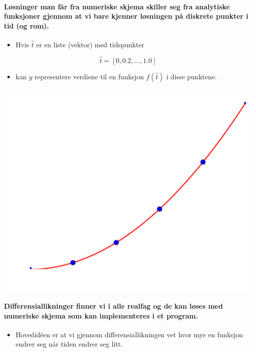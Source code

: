 \documentclass[%
oneside,                 %
final,                   %
10pt,norsk]{article}
\begin{document}
\noindent


\paragraph{Løsninger man får fra numeriske skjema skiller seg fra analytiske funksjoner gjennom at vi bare kjenner løsningen på diskrete punkter i tid (og rom).}
\begin{itemize}
\item Hvis $\hat{t}$ er en liste (vektor) med tidspunkter
\end{itemize}

\noindent
\[\hat{t}=[0, 0.2, \ldots, 1.0]\]
\begin{itemize}
\item kan $y$ representere verdiene til en funksjon $f(\hat{t})$ i disse punktene.
\end{itemize}

\noindent



\centerline{\includegraphics[width=0.6\linewidth]{fig/diskret_funksjon.pdf}}




\paragraph{Differensiallikninger finner vi i alle realfag og de kan løses med numeriske skjema som kan implementeres i et program.}
\begin{itemize}
\item Hovedidéen er at vi gjennom differensiallikningen vet hvor mye en funksjon endrer seg når tiden endrer seg litt.
\end{itemize}
\end{document}
